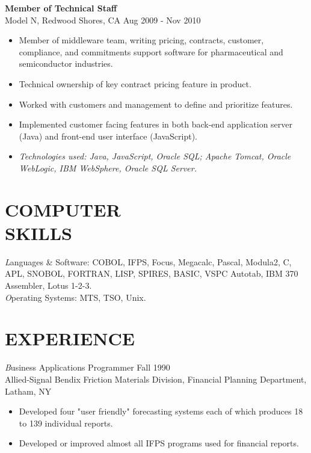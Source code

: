 \documentclass[line,margin]{res}
\begin{document}
\begin{resume}
\textbf{Member of Technical Staff} \\
Model N, Redwood Shores, CA \hfill Aug 2009 - Nov 2010
\begin{itemize}  \itemsep -2pt %
\item Member of middleware team, writing pricing, contracts, customer,
      compliance, and commitments support software for pharmaceutical and
      semiconductor industries.
\item Technical ownership of key contract pricing feature in product.
\item Worked with customers and management to define and prioritize features.
\item Implemented customer facing features in both back-end application server
      (Java) and front-end user interface (JavaScript).
\item \textit{Technologies used: Java, JavaScript, Oracle SQL; Apache Tomcat,
              Oracle WebLogic, IBM WebSphere, Oracle SQL Server.}
\end{itemize}
 
\section{COMPUTER \\ SKILLS} {\textit Languages \& Software:} COBOL, IFPS, Focus, 
         Megacalc, Pascal, Modula2, C, APL, SNOBOL, 
                FORTRAN, LISP, SPIRES, BASIC, VSPC Autotab, 
                IBM 370 Assembler, Lotus 1-2-3. \\
                {\textit Operating Systems:} MTS, TSO, Unix.
 
\section{EXPERIENCE} {\textit Business Applications Programmer} \hfill Fall 1990 \\
                Allied-Signal Bendix Friction Materials Division, 
                Financial Planning Department, Latham, NY
                 \begin{itemize}  \itemsep -2pt %
                 \item Developed four "user friendly" forecasting 
                    systems each of which produces 18 to 139 
                    individual reports. 
                \item   Developed or improved almost all IFPS 
                    programs used for financial reports. 
                \end{itemize}
 

\end{resume}
\end{document}
